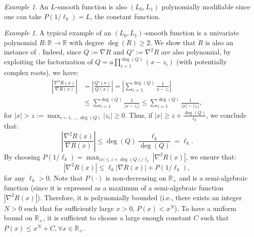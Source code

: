 \documentclass{article}
\theoremstyle{plain}
\theoremstyle{definition}
\theoremstyle{remark}
\newtheorem{example}[theorem]{Example}
\newcommand*{\RR}{\mathbb{R}}
\begin{document}
\begin{example}
    \label{ex:L-smooth-is-good}
    An $L$-smooth function is also $(L_0,L_1)$ polynomially modifiable since one can take $P(1/\ell_k) = L$, the constant function.  
\end{example}

\begin{example}
    \label{ex:univariate-poly-is-good}
    A typical example of an $(L_0,L_1)$-smooth function is a univariate polynomial $R: \RR \to \RR$ with degree $\deg(R) \geq 2$. We show that $R$ is also an instance of . Indeed, since $Q:= \nabla R$ and $Q':= \nabla^2 R$ are also polynomial, by exploiting the factorization of $Q = a\prod_{i = 1}^{\deg(Q)} (x - z_i)$ (with potentially complex roots), we have:
    \begin{equation*}
        \begin{aligned}
            \left|\frac{\nabla^2 R(x)}{\nabla R(x)}\right| &= \left|\frac{Q'(x)}{Q(x)}\right| = \left|\sum_{i = 1}^{\deg(Q)} \frac{1}{x - z_i}\right|\\
            &\leq \sum_{i = 1}^{\deg(Q)} \frac{1}{|x - z_i|} \leq \sum_{i = 1}^{\deg(Q)} \frac{1}{|x| - |z_i|},
        \end{aligned}
    \end{equation*}
    for $|x| > z:= \max_{i = 1, \ldots, \deg(Q)} |z_i| \geq 0$. Thus, if $|x| \geq z + \frac{\deg(Q)}{\ell_k}$, we conclude that:
    \begin{equation*}
        \left|\frac{\nabla^2 R(x)}{\nabla R(x)}\right| \leq \deg(Q) \frac{\ell_k}{\deg(Q)} = \ell_k.
    \end{equation*}
    By choosing $P(1 / \ell_k) = \max_{|x| \leq z + \deg(Q)/\ell_k} |\nabla^2 R(x)|$, we ensure that:
    \begin{equation*}
        |\nabla^2 R(x)| \leq \ell_k|\nabla R(x)| + P(1/\ell_k),
    \end{equation*}
    for any $\ell_k > 0$. Note that $P(\cdot)$ is non-decreasing on $\RR_+$ and is a semi-algebraic function (since it is expressed as a maximum of a semi-algebraic function $|\nabla^2 R(x)|$). Therefore, it is polynomially bounded (i.e., there exists an integer $N > 0$ such that for sufficiently large $x > 0$, $P(x) < x^N$). To have a uniform bound on $\RR_+$, it is sufficient to choose a large enough constant $C$ such that $P(x) \leq x^N + C, \forall x \in \RR_+$.
\end{example}
\end{document}
